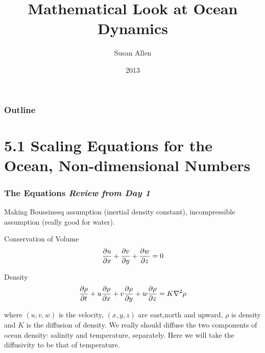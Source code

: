 \documentclass[xcolor=dvipsnames]{beamer}
\title{Mathematical Look at Ocean Dynamics}    %
\author{Susan Allen}                 %
\institute{UBC}      %
\date{2013}                    %
\begin{document}
\begin{frame}
  \titlepage
\end{frame}

\begin{frame}
\frametitle{Outline}
  \tableofcontents
\end{frame}


\section{5.1 Scaling Equations for the Ocean, Non-dimensional Numbers}

\begin{frame}
  \frametitle{The Equations {\it Review from Day 1}}   %

Making Boussinesq assumption (inertial density constant), incompressible assumption (really good for water).

Conservation of Volume\\
\[ \frac {\partial u}{\partial x} + \frac {\partial v}{\partial y} + \frac {\partial w}{\partial z} = 0 \]

Density\\
\[ \frac {\partial \rho}{\partial t} + u \frac {\partial \rho}{\partial x} + v \frac {\partial \rho}{\partial y} + w \frac {\partial \rho}{\partial z} = K \nabla^2 \rho \]

where $(u,v,w)$ is the velocity, $(x,y,z)$ are east,north and upward, $\rho$ is density and $K$ is the diffusion of density.  We really should diffuse the two components of ocean density: salinity and temperature, separately.  Here we will take the diffusivity to be that of temperature.

\end{frame}
\end{document}
